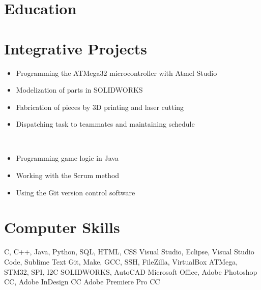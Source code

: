 \documentclass[11pt,letterpaper,sans]{moderncv}        %
\begin{document}
\makecvtitle


\section{Education}


\section{Integrative Projects}
{%
\begin{itemize}%
 \item Programming the ATMega32 microcontroller with Atmel Studio%
 \item Modelization of parts in SOLIDWORKS%
 \item Fabrication of pieces by 3D printing and laser cutting%
 \item Dispatching task to teammates and maintaining schedule%
\end{itemize}}
\ \\
{%
\begin{itemize}%
 \item Programming game logic in Java%
 \item Working with the Scrum method%
 \item Using the Git version control software%
\end{itemize}}


\section{Computer Skills}
      {C, C++, Java, Python, SQL, HTML, CSS}
             {Visual Studio, Eclipse, Visual Studio Code, Sublime Text}
        {Git, Make, GCC, SSH, FileZilla, VirtualBox}
 {ATMega, STM32, SPI, I2C}
     {SOLIDWORKS, AutoCAD}
            {Microsoft Office, Adobe Photoshop CC, Adobe InDesign CC Adobe Premiere Pro CC}
\end{document}
